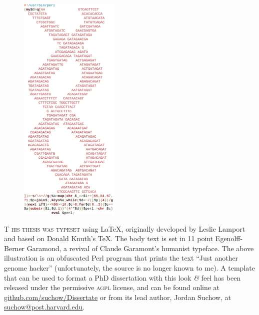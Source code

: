 \newpage

\begin{figure}[h]
  \centering
  \includegraphics[width=0.42\textwidth]{endmatter/jagh}
\end{figure}

\newpage

\begin{center}
\parbox{200pt}{\lettrine[lines=3,slope=-2pt,nindent=-4pt]{\textcolor{SchoolColor}{T}}{ his thesis was typeset} using \LaTeX, originally developed by Leslie Lamport and based on Donald Knuth's \TeX. The body text is set in 11 point Egenolff-Berner Garamond, a revival of Claude Garamont's humanist typeface. The above illustration is an obfuscated Perl program that prints the text ``Just another genome hacker'' (unfortunately, the source is no longer known to me). A template that can be used to format a PhD dissertation with this look \textit{\&} feel has been released under the permissive \textsc{agpl} license, and can be found online at \href{https://github.com/suchow/Dissertate}{github.com/suchow/Dissertate} or from its lead author, Jordan Suchow, at \href{mailto:suchow@post.harvard.edu}{suchow@post.harvard.edu}.}
\end{center}
